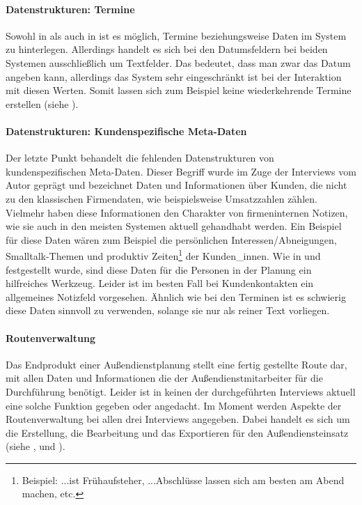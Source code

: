 \documentclass[Bachelorarbeit.tex]{subfiles}
\begin{document}
\paragraph{Datenstrukturen: Termine}
Sowohl in  als auch in  ist es möglich, Termine beziehungsweise Daten im System zu hinterlegen. 
Allerdings handelt es sich bei den Datumsfeldern bei beiden Systemen ausschließlich um Textfelder. 
Das bedeutet, dass man zwar das Datum angeben kann, allerdings das System sehr eingeschränkt ist bei der Interaktion mit diesen Werten. 
Somit lassen sich zum Beispiel keine wiederkehrende Termine erstellen (siehe ).


\paragraph{Datenstrukturen: Kundenspezifische Meta-Daten}
Der letzte Punkt behandelt die fehlenden Datenstrukturen von kundenspezifischen Meta-Daten.
Dieser Begriff wurde im Zuge der Interviews vom Autor geprägt und bezeichnet Daten und Informationen über Kunden, die nicht zu den klassischen Firmendaten, wie beispielsweise Umsatzzahlen zählen. 
Vielmehr haben diese Informationen den Charakter von firmeninternen Notizen, wie sie auch in den meisten Systemen aktuell gehandhabt werden.
Ein Beispiel für diese Daten wären zum Beispiel die persönlichen Interessen/Abneigungen, Smalltalk-Themen und produktiv Zeiten\footnote{Beispiel: ...ist Frühaufsteher, ...Abschlüsse lassen sich am besten am Abend machen, etc.} der Kunden\_innen. 
Wie in  und  festgestellt wurde, sind diese Daten für die Personen in der Planung ein hilfreiches Werkzeug. 
Leider ist im besten Fall bei Kundenkontakten ein allgemeines Notizfeld vorgesehen. 
Ähnlich wie bei den Terminen ist es schwierig diese Daten sinnvoll zu verwenden, solange sie nur als reiner Text vorliegen.
\\ [1.0cm]

\paragraph{Routenverwaltung}
\label{interviewsAnalyseRoutenverwaltung}
Das Endprodukt einer Außendienstplanung stellt eine fertig gestellte Route dar,  mit allen Daten und Informationen die der Außendienstmitarbeiter für die Durchführung benötigt.
Leider ist in keinen der durchgeführten Interviews aktuell eine solche Funktion gegeben oder angedacht.
Im Moment werden Aspekte der Routenverwaltung bei allen drei Interviews angegeben.
Dabei handelt es sich um die Erstellung, die Bearbeitung und das Exportieren für den Außendiensteinsatz (siehe ,  und ). 
\\ [1.0cm]
\end{document}
